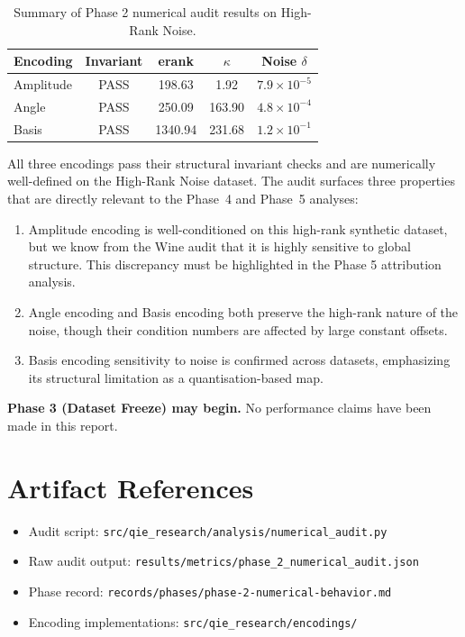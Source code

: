 \documentclass[11pt, a4paper]{article}
\begin{document}
\begin{table}[h]
\centering
\begin{tabular}{lcccc}
\toprule
\textbf{Encoding} & \textbf{Invariant} & \textbf{erank} &
\textbf{$\kappa$} & \textbf{Noise $\delta$} \\
\midrule
Amplitude & \textcolor{green!60!black}{PASS} & 198.63  & 1.92   & $7.9 \times 10^{-5}$ \\
Angle     & \textcolor{green!60!black}{PASS} & 250.09  & 163.90 & $4.8 \times 10^{-4}$ \\
Basis     & \textcolor{green!60!black}{PASS} & 1340.94 & 231.68 & $1.2 \times 10^{-1}$ \\
\bottomrule
\end{tabular}
\caption{Summary of Phase 2 numerical audit results on High-Rank Noise.}
\end{table}

All three encodings pass their structural invariant checks and are
numerically well-defined on the High-Rank Noise dataset.  The audit surfaces
three properties that are directly relevant to the Phase~4 and Phase~5
analyses:

\begin{enumerate}
    \item Amplitude encoding is well-conditioned on this high-rank synthetic 
    dataset, but we know from the Wine audit that it is highly sensitive to
    global structure. This discrepancy must be highlighted in the Phase 5
    attribution analysis.

    \item Angle encoding and Basis encoding both preserve the high-rank
    nature of the noise, though their condition numbers are affected by
    large constant offsets.

    \item Basis encoding sensitivity to noise is confirmed across datasets,
    emphasizing its structural limitation as a quantisation-based map.
\end{enumerate}

\textbf{Phase 3 (Dataset Freeze) may begin.}  No performance claims have
been made in this report.

\section{Artifact References}

\begin{itemize}
    \item Audit script:
    \texttt{src/qie\_research/analysis/numerical\_audit.py}
    \item Raw audit output:
    \texttt{results/metrics/phase\_2\_numerical\_audit.json}
    \item Phase record:
    \texttt{records/phases/phase-2-numerical-behavior.md}
    \item Encoding implementations:
    \texttt{src/qie\_research/encodings/}
\end{itemize}
\end{document}
